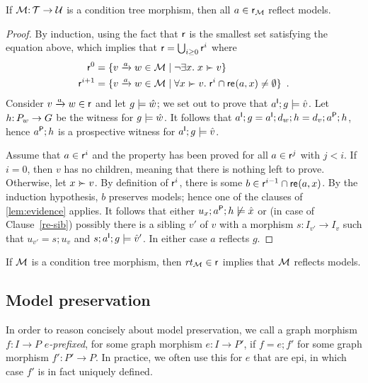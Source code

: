 \begin{lemma}\label{lem:reflection}
If $\cM\of \cT\to \cU$ is a condition tree morphism, then all $a\in\rgen_\cM$ reflect models.
\end{lemma}
%
\begin{proof}
By induction, using the fact that $\rgen$ is the smallest set satisfying the equation above, which implies that $\rgen=\bigcup_{i\geq 0} \rgen^i$ where
%
\begin{align*}
\rgen^0 = {} & \gensetof{\trip vaw\in \cM}{\neg \exists x\st x\childof v} \\
\rgen^{i+1} = {} & \gensetof{\trip vaw\in \cM}{\forall x\childof v\st \rgen^i \cap \re{a,x} \neq\emptyset} \enspace.
\end{align*}
%
Consider $\trip vaw\in \rgen$ and let $g\sat \hat w$; we set out to prove that $a\I;g\sat \hat v$. Let $h\of P_w\to G$ be the witness for $g\sat \hat w$. It follows that $a\I;g=a\I;d_w;h=d_v;a\P;h$, hence $a\P;h$ is a prospective witness for $a\I;g\sat \hat v$.

Assume that $a\in \rgen^i$ and the property has been proved for all $a\in \rgen^j$ with $j<i$. If $i=0$, then $v$ has no children, meaning that there is nothing left to prove. Otherwise, let $x\childof v$. By definition of $\rgen^i$, there is some $b\in \rgen^{i-1} \cap \re{a,x}$. By the induction hypothesis, $b$ preserves models; hence one of the clauses of \cref{lem:evidence} applies. It follows that either $u_x;a\P;h\nsat \hat x$ or (in case of Clause~\ref{re-sib}) possibly there is a sibling $v'$ of $v$ with a morphism $s:I_{v'}\to I_v$ such that $u_{v'}=s;u_v$ and $s;a\I;g\sat \hat v'$. In either case $a$ reflects $g$.
\end{proof}

\begin{corollary}
If $\cM$ is a condition tree morphism, then $\rt\cM\in \rgen$ implies that $\cM$ reflects models.
\end{corollary}

\subsection{Model preservation}

In order to reason concisely about model preservation, we call a graph morphism $f:I\to P$ \emph{$e$-prefixed}, for some graph morphism $e:I\to P'$, if $f=e;f'$ for some graph morphism $f':P'\to P$. In practice, we often use this for $e$ that are epi, in which case $f'$ is in fact uniquely defined.

